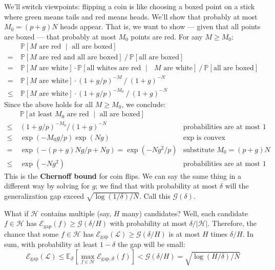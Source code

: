 \documentclass{article}
\newcommand{\EE}{\mathbb{E}}
\newcommand{\PP}{\mathbb{P}}
\newcommand{\Ee}{\mathcal{E}}
\newcommand{\Gg}{\mathcal{G}}
\newcommand{\Hh}{\mathcal{H}}
\newcommand{\Ll}{\mathcal{L}}
\newcommand{\Ss}{\mathcal{S}}
\begin{document}
            We'll switch viewpoints: flipping a coin is like choosing a boxed
            point on a stick where green means tails and red means heads.
            We'll show that probably at most $M_0 = (p+g)N$ heads
            appear.  That is, we want to show --- given that all points are
            boxed --- that probably at most $M_0$ points are red. 
            For any $M\geq M_0$:
            \begin{align*}
                    & ~ \PP[\text{$M$ are red $\mid$ all are boxed}] \\
                  = & ~ \PP[\text{$M$ are red and all are boxed}] ~/~ 
                        \PP[\text{all are boxed}]  \\
                  = & ~ \PP[\text{$M$ are white}] \cdot
                        \PP[\text{all whites are red $\mid$ $M$ are white}] ~/~
                        \PP[\text{all are boxed}] \\
                  = & ~ \PP[\text{$M$ are white}] \cdot (1+g/p)^{-M} ~/~ (1+g)^{-N}  \\
                \leq& ~ \PP[\text{$M$ are white}] \cdot (1+g/p)^{-M_0} ~/~ (1+g)^{-N} 
            \end{align*}
            Since the above holds for all $M\geq M_0$, we conclude:
            \begin{align*}
                ~   & ~ \PP[\text{at least $M_0$ are red $\mid$ all are boxed}] & \\
                \leq& ~ (1+g/p)^{-M_0} / (1+g)^{-N}             & \text{probabilities are at most $1$} \\
                \leq& ~ \exp(-M_0 g/p) \exp(Ng)                 & \text{$\exp$ is convex} \\ 
                =   & ~ \exp(-(p+g)N g/p + Ng) = \exp(-Ng^2/p)  & \text{substitute $M_0=(p+g)N$} \\ 
                \leq& ~ \exp(-Ng^2)                             & \text{probabilities are at most $1$}
            \end{align*}
            This is the \textbf{Chernoff bound} for coin flips.  We can say the
            same thing in a different way by solving for $g$; we find that with
            probability at most $\delta$ will the generalization gap exceed
            $\sqrt{\log(1/\delta)/N}$.  Call this $\Gg(\delta)$.

            What if $\Hh$ contains multiple (say, $H$ many) candidates?
            Well, each candidate $f\in \Hh$ has
            $
                \Ee_{\text{gap}}(f) \geq \Gg(\delta/H)
            $
            with probability at most $\delta/|\Hh|$.  Therefore, the chance
            that some $f\in \Hh$ has
            $
                \Ee_{\text{gap}}(\Ll) \geq \Gg(\delta/H)
            $
            is at most $H$ times $\delta/H$.  In sum,
            with probability at least $1-\delta$ the gap will be small:
            $$
                \Ee_{\text{gap}}(\Ll)
                    \leq \EE_{\Ss}\left[\max_{f\in\Hh} \Ee_{\text{gap}, \Ss}(f)\right]
                    < \Gg(\delta/H)
                    = \sqrt{\log(H/\delta)/N}
            $$
\end{document}
